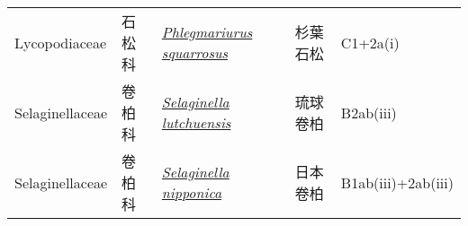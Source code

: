 {\begin{longtable}{L{2.5cm}L{2cm}L{5cm}L{2.5cm}L{3cm}}
    Lycopodiaceae & 石松科 & \href{http://www.theplantlist.org/tpl1.1/search?q=Phlegmariurus+squarrosus}{\textit{Phlegmariurus squarrosus} } & 杉葉石松 & C1+2a(i)    \\
    Selaginellaceae & 卷柏科 & \href{http://www.theplantlist.org/tpl1.1/search?q=Selaginella+lutchuensis}{\textit{Selaginella lutchuensis} } & 琉球卷柏 & B2ab(iii)    \\
    Selaginellaceae & 卷柏科 & \href{http://www.theplantlist.org/tpl1.1/search?q=Selaginella+nipponica}{\textit{Selaginella nipponica} } & 日本卷柏 & B1ab(iii)+2ab(iii)    \\
    \bottomrule
        \end{longtable}
        }
    
